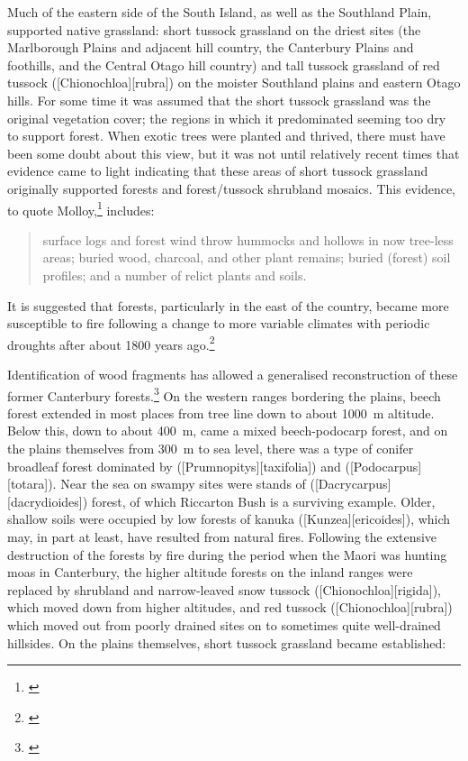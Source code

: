 Much of the eastern side of the South Island, as well as the Southland Plain, supported native grassland: short tussock grassland on the driest sites (the Marlborough Plains and adjacent hill country, the Canterbury Plains and foothills, and the Central Otago hill country) and tall tussock grassland of red tussock ([Chionochloa][rubra]) on the moister Southland plains and eastern Otago hills.
For some time it was assumed that the short tussock grassland was the original vegetation cover; the regions in which it predominated seeming too dry to support forest.
When exotic trees were planted and thrived, there must have been some doubt about this view, but it was not until relatively recent times that evidence came to light indicating that these areas of short tussock grassland originally supported forests and forest/tussock shrubland mosaics.
This evidence, to quote Molloy,\footnote{\cite{molloybpj1963distribution}} includes:

\begin{quote}
	surface logs and forest wind throw hummocks and hollows in now tree-less areas; buried wood, charcoal, and other plant remains; buried (forest) soil profiles; and a number of relict plants and soils.
\end{quote}

It is suggested that forests, particularly in the east of the country, became more susceptible to fire following a change to more variable climates with periodic droughts after about 1800 years ago.\footnote{\cite{mcglone1977ascarina}}

Identification of wood fragments has allowed a generalised reconstruction of these former Canterbury forests.\footnote{\cite{molloy1969recent}}
On the western ranges bordering the plains, beech forest extended in most places from tree line down to about \SI{1000}{\metre} altitude.
Below this, down to about \SI{400}{\metre}, came a mixed beech-podocarp forest, and on the plains themselves from \SI{300}{\metre} to sea level, there was a type of conifer broadleaf forest dominated by  ([Prumnopitys][taxifolia]) and  ([Podocarpus][totara]).
Near the sea on swampy sites were stands of  ([Dacrycarpus][dacrydioides]) forest, of which Riccarton Bush is a surviving example.
Older, shallow soils were occupied by low forests of kanuka ([Kunzea][ericoides]), which may, in part at least, have resulted from natural fires.
Following the extensive destruction of the forests by fire during the period when the Maori was hunting moas in Canterbury, the higher altitude forests on the inland ranges were replaced by shrubland and narrow-leaved snow tussock ([Chionochloa][rigida]), which moved down from higher altitudes, and red tussock ([Chionochloa][rubra]) which moved out from poorly drained sites on to sometimes quite well-drained hillsides.
On the plains themselves, short tussock grassland became established:

